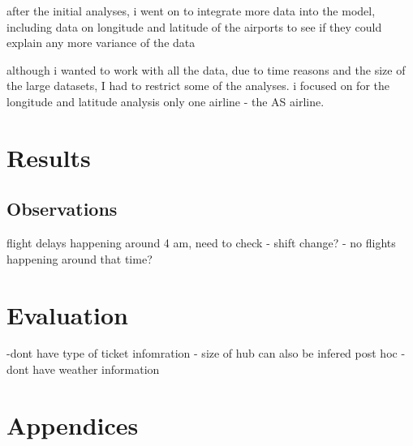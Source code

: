 \documentclass[a4paper, 11pt]{article}
\begin{document}
after the initial analyses, i went on to integrate more data into the model, including data on longitude and latitude of the airports to see if they could explain any more variance of the data

although i wanted to work with all the data, due to time reasons and the size of the large datasets, I had to restrict some of the analyses. i focused on for the longitude and latitude analysis only one airline - the AS airline.


\section{Results}


\subsection{Observations}
flight delays happening around 4 am, need to check
- shift change?
- no flights happening around that time?

\section{Evaluation}
-dont have type of ticket infomration
- size of hub can also be infered post hoc
- dont have weather information



\clearpage
\begin{thebibliography}{100}
\end{thebibliography}

\newpage
\section*{Appendices}
\end{document}
